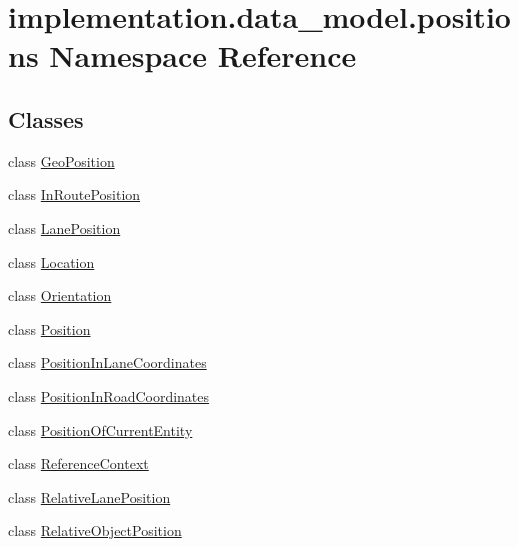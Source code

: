 \hypertarget{namespaceimplementation_1_1data__model_1_1positions}{}\section{implementation.\+data\+\_\+model.\+positions Namespace Reference}
\label{namespaceimplementation_1_1data__model_1_1positions}
\subsection*{Classes}
\begin{DoxyCompactItemize}
\item 
class \hyperlink{classimplementation_1_1data__model_1_1positions_1_1_geo_position}{Geo\+Position}
\item 
class \hyperlink{classimplementation_1_1data__model_1_1positions_1_1_in_route_position}{In\+Route\+Position}
\item 
class \hyperlink{classimplementation_1_1data__model_1_1positions_1_1_lane_position}{Lane\+Position}
\item 
class \hyperlink{classimplementation_1_1data__model_1_1positions_1_1_location}{Location}
\item 
class \hyperlink{classimplementation_1_1data__model_1_1positions_1_1_orientation}{Orientation}
\item 
class \hyperlink{classimplementation_1_1data__model_1_1positions_1_1_position}{Position}
\item 
class \hyperlink{classimplementation_1_1data__model_1_1positions_1_1_position_in_lane_coordinates}{Position\+In\+Lane\+Coordinates}
\item 
class \hyperlink{classimplementation_1_1data__model_1_1positions_1_1_position_in_road_coordinates}{Position\+In\+Road\+Coordinates}
\item 
class \hyperlink{classimplementation_1_1data__model_1_1positions_1_1_position_of_current_entity}{Position\+Of\+Current\+Entity}
\item 
class \hyperlink{classimplementation_1_1data__model_1_1positions_1_1_reference_context}{Reference\+Context}
\item 
class \hyperlink{classimplementation_1_1data__model_1_1positions_1_1_relative_lane_position}{Relative\+Lane\+Position}
\item 
class \hyperlink{classimplementation_1_1data__model_1_1positions_1_1_relative_object_position}{Relative\+Object\+Position}
\item 

\end{DoxyCompactItemize}
